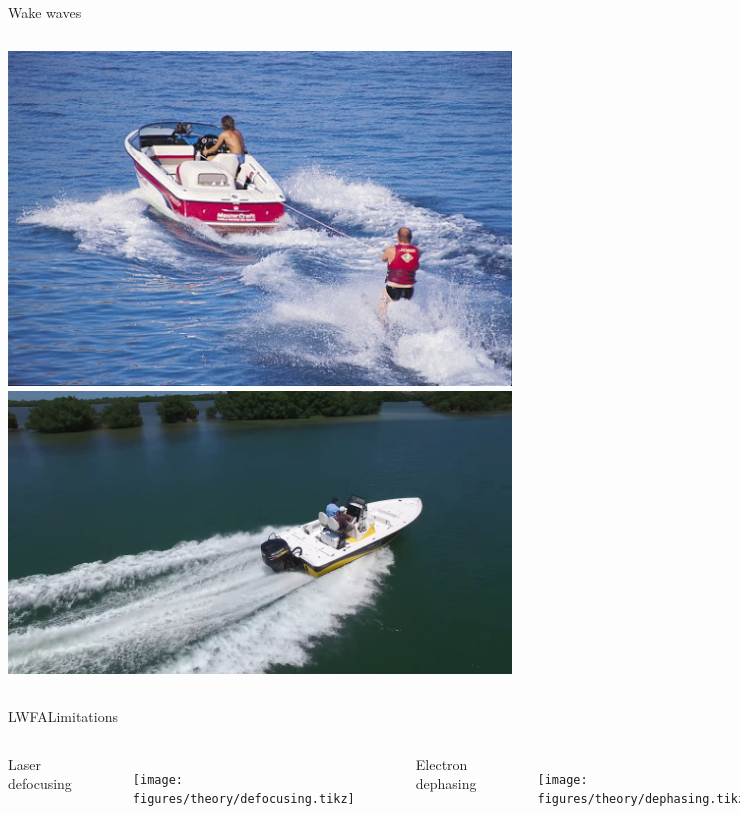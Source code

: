 \documentclass[dvipsnames]{beamer}
\begin{document}
  \begin{frame}{Wake waves}
    \begin{columns}  
          \includegraphics[width=\textwidth]{figures/theory/boat_ski.jpg}
          \includegraphics[width=\textwidth]{figures/theory/boat_wake.jpg}
    \end{columns}
  \end{frame}
  \begin{frame}{LWFA}{Limitations}
    \begin{columns}  
    Laser defocusing
      \begin{figure}
          \texttt{[image: figures/theory/defocusing.tikz]}
      \end{figure}
      Electron dephasing
      \begin{figure}
          \texttt{[image: figures/theory/dephasing.tikz]}
      \end{figure}
    \end{columns}
  \end{frame}
\end{document}
